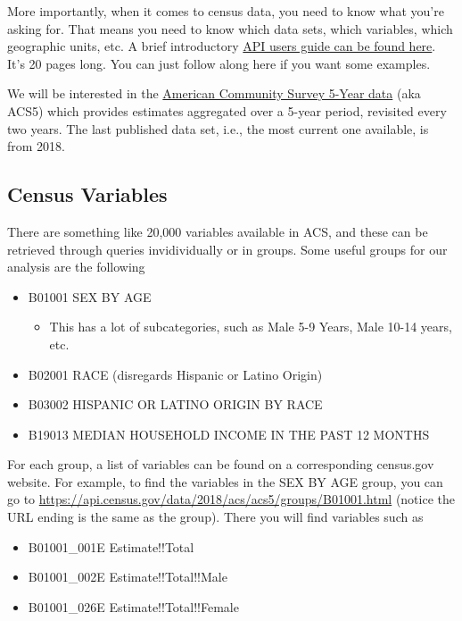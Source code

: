 \documentclass[
  openany]{book}
\providecommand{\tightlist}{%
  \setlength{\itemsep}{0pt}\setlength{\parskip}{0pt}}
\begin{document}
More importantly, when it comes to census data, you need to know what you're asking for. That means you need to know which data sets, which variables, which geographic units, etc. A brief introductory \href{https://www.census.gov/content/dam/Census/data/developers/api-user-guide/api-guide.pdf}{API users guide can be found here}. It's 20 pages long. You can just follow along here if you want some examples.

We will be interested in the \href{https://www.census.gov/data/developers/data-sets/acs-5year.html}{American Community Survey 5-Year data} (aka ACS5) which provides estimates aggregated over a 5-year period, revisited every two years. The last published data set, i.e., the most current one available, is from 2018.

\hypertarget{census-variables}{%
\subsection*{Census Variables}\label{census-variables}}

There are something like 20,000 variables available in ACS, and these can be retrieved through queries invidividually or in groups. Some useful groups for our analysis are the following

\begin{itemize}
\tightlist
\item
  B01001 SEX BY AGE

  \begin{itemize}
  \tightlist
  \item
    This has a lot of subcategories, such as Male 5-9 Years, Male 10-14 years, etc.
  \end{itemize}
\item
  B02001 RACE (disregards Hispanic or Latino Origin)
\item
  B03002 HISPANIC OR LATINO ORIGIN BY RACE\\
\item
  B19013 MEDIAN HOUSEHOLD INCOME IN THE PAST 12 MONTHS
\end{itemize}

For each group, a list of variables can be found on a corresponding census.gov website. For example, to find the variables in the SEX BY AGE group, you can go to \url{https://api.census.gov/data/2018/acs/acs5/groups/B01001.html} (notice the URL ending is the same as the group). There you will find variables such as

\begin{itemize}
\tightlist
\item
  B01001\_001E Estimate!!Total
\item
  B01001\_002E Estimate!!Total!!Male
\item
  B01001\_026E Estimate!!Total!!Female
\end{itemize}
\end{document}

